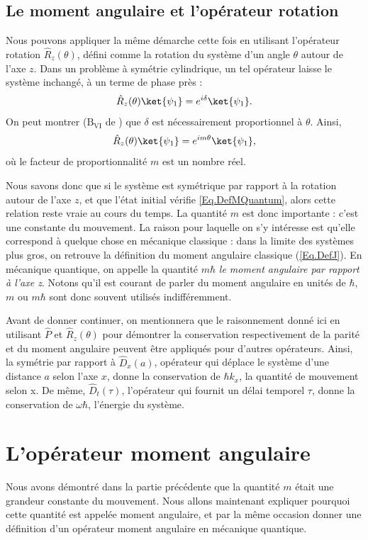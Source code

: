 \subsection{Le moment angulaire et l'opérateur rotation}
Nous pouvons appliquer la même démarche cette fois en utilisant l'opérateur rotation $\hat{R}_z(\theta)$, défini comme la rotation du système d'un angle $\theta$ autour de l'axe $z$. Dans un problème à symétrie cylindrique, un tel opérateur laisse le système inchangé, à un terme de phase près :
\begin{equation*}
\hat{R}_z(\theta)\ket{\psi_1}=e^{i\delta}\ket{\psi_1}.
\end{equation*}
On peut montrer ($\text{B}_{\text{VI}}$ de ) que $\delta$ est nécessairement proportionnel à $\theta$. Ainsi,
\begin{equation}
\hat{R}_z(\theta)\ket{\psi_1}=e^{im\theta}\ket{\psi_1},
\label{Eq.DefMQuantum}
\end{equation}
où le facteur de proportionnalité $m$ est un nombre réel.

Nous savons donc que si le système est symétrique par rapport à la rotation autour de l'axe $z$, et que l'état initial vérifie \ref{Eq.DefMQuantum}, alors cette relation reste vraie au cours du temps. La quantité $m$ est donc importante : c'est une constante du mouvement. La raison pour laquelle on s'y intéresse est qu'elle correspond à quelque chose en mécanique classique : dans la limite des systèmes plus gros, on retrouve la définition du moment angulaire classique 
(\ref{Eq.DefJ}). En mécanique quantique, on appelle la quantité $m\hbar$ \textit{le moment angulaire par rapport à l'axe z}. Notons qu'il est courant de parler du moment angulaire en unités de $\hbar$, $m$ ou $m\hbar$ sont donc souvent utilisés indifféremment.

Avant de donner continuer, on mentionnera que le raisonnement donné ici en utilisant $\hat{P}$ et $\hat{R}_z(\theta)$ pour démontrer la conservation respectivement de la parité et du moment angulaire peuvent être appliqués pour d'autres opérateurs. Ainsi, la symétrie par rapport à $\hat{D}_x(a)$, opérateur qui déplace le système d'une distance $a$ selon l'axe $x$, donne la conservation de $\hbar k_x$, la quantité de mouvement selon x. De même, $\hat{D}_t(\tau)$, l'opérateur qui fournit un délai temporel $\tau$, donne la conservation de $\omega \hbar$, l'énergie du système.

\section{L'opérateur moment angulaire}
Nous avons démontré dans la partie précédente que la quantité $m$ était une grandeur constante du mouvement. Nous allons maintenant expliquer pourquoi cette quantité est appelée moment angulaire, et par la même occasion donner une définition d'un opérateur moment angulaire en mécanique quantique.

